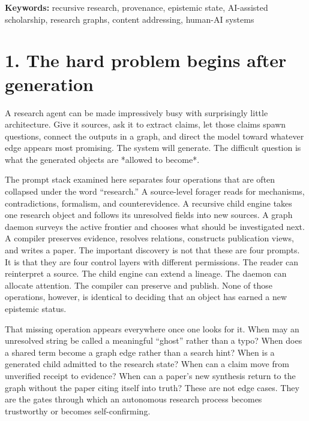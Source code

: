 \documentclass[11pt]{article}
\begin{document}
\noindent\textbf{Keywords:} recursive research, provenance, epistemic state, AI-assisted scholarship, research graphs, content addressing, human-AI systems



\section*{1. The hard problem begins after generation}



A research agent can be made impressively busy with surprisingly little architecture. Give it sources, ask it to extract claims, let those claims spawn questions, connect the outputs in a graph, and direct the model toward whatever edge appears most promising. The system will generate. The difficult question is what the generated objects are *allowed to become*.



The prompt stack examined here separates four operations that are often collapsed under the word “research.” A source-level forager reads for mechanisms, contradictions, formalism, and counterevidence. A recursive child engine takes one research object and follows its unresolved fields into new sources. A graph daemon surveys the active frontier and chooses what should be investigated next. A compiler preserves evidence, resolves relations, constructs publication views, and writes a paper. The important discovery is not that these are four prompts. It is that they are four control layers with different permissions. The reader can reinterpret a source. The child engine can extend a lineage. The daemon can allocate attention. The compiler can preserve and publish. None of those operations, however, is identical to deciding that an object has earned a new epistemic status.



That missing operation appears everywhere once one looks for it. When may an unresolved string be called a meaningful “ghost” rather than a typo? When does a shared term become a graph edge rather than a search hint? When is a generated child admitted to the research state? When can a claim move from unverified receipt to evidence? When can a paper’s new synthesis return to the graph without the paper citing itself into truth? These are not edge cases. They are the gates through which an autonomous research process becomes trustworthy or becomes self-confirming.
\end{document}
